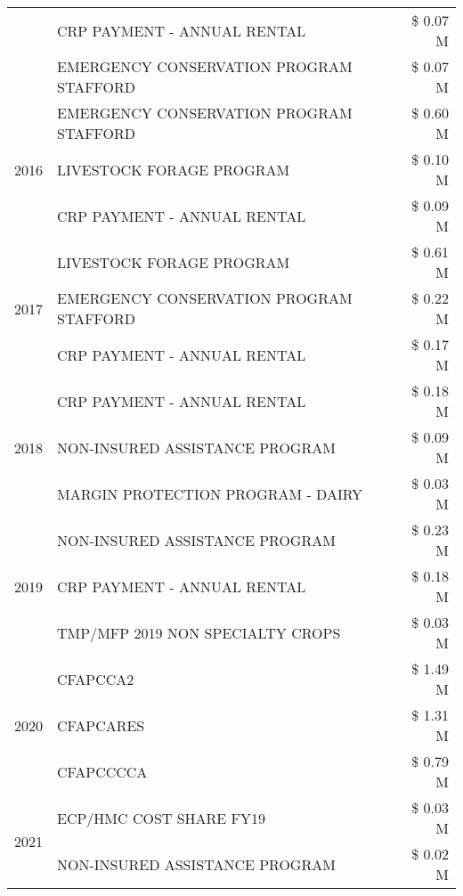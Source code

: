 \begin{tabular}{llr}
 & CRP PAYMENT - ANNUAL RENTAL & \$ 0.07 M \\
 & EMERGENCY CONSERVATION PROGRAM STAFFORD & \$ 0.07 M \\
\cline{1-3}
\multirow[t]{3}{*}{2016} & EMERGENCY CONSERVATION PROGRAM STAFFORD & \$ 0.60 M \\
 & LIVESTOCK FORAGE PROGRAM & \$ 0.10 M \\
 & CRP PAYMENT - ANNUAL RENTAL & \$ 0.09 M \\
\cline{1-3}
\multirow[t]{3}{*}{2017} & LIVESTOCK FORAGE PROGRAM & \$ 0.61 M \\
 & EMERGENCY CONSERVATION PROGRAM STAFFORD & \$ 0.22 M \\
 & CRP PAYMENT - ANNUAL RENTAL & \$ 0.17 M \\
\cline{1-3}
\multirow[t]{3}{*}{2018} & CRP PAYMENT - ANNUAL RENTAL & \$ 0.18 M \\
 & NON-INSURED ASSISTANCE PROGRAM & \$ 0.09 M \\
 & MARGIN PROTECTION PROGRAM - DAIRY & \$ 0.03 M \\
\cline{1-3}
\multirow[t]{3}{*}{2019} & NON-INSURED ASSISTANCE PROGRAM & \$ 0.23 M \\
 & CRP PAYMENT - ANNUAL RENTAL & \$ 0.18 M \\
 & TMP/MFP 2019 NON SPECIALTY CROPS & \$ 0.03 M \\
\cline{1-3}
\multirow[t]{3}{*}{2020} & CFAPCCA2 & \$ 1.49 M \\
 & CFAPCARES & \$ 1.31 M \\
 & CFAPCCCCA & \$ 0.79 M \\
\cline{1-3}
\multirow[t]{2}{*}{2021} & ECP/HMC COST SHARE FY19 & \$ 0.03 M \\
 & NON-INSURED ASSISTANCE PROGRAM & \$ 0.02 M \\
\cline{1-3}
\bottomrule
\end{tabular}
